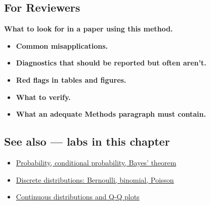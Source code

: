 \documentclass[
]{article}
\providecommand{\tightlist}{%
  \setlength{\itemsep}{0pt}\setlength{\parskip}{0pt}}
\begin{document}
\subsection{For Reviewers}\label{for-reviewers}

\textbf{What to look for in a paper using this method.}

\begin{itemize}
\tightlist
\item
  \textbf{Common misapplications.}
\item
  \textbf{Diagnostics that should be reported but often aren't.}
\item
  \textbf{Red flags in tables and figures.}
\item
  \textbf{What to verify.}
\item
  \textbf{What an adequate Methods paragraph must contain.}
\end{itemize}

\subsection{See also --- labs in this
chapter}\label{see-also-labs-in-this-chapter}

\begin{itemize}
\tightlist
\item
  \href{labs/lab-probability-conditional-probability-bayes-theorem.Rmd}{Probability,
  conditional probability, Bayes' theorem}
\item
  \href{labs/lab-discrete-distributions-bernoulli-binomial-poisson.Rmd}{Discrete
  distributions: Bernoulli, binomial, Poisson}
\item
  \href{labs/lab-continuous-distributions-and-q-q-plots.Rmd}{Continuous
  distributions and Q-Q plots}
\end{itemize}
\end{document}
